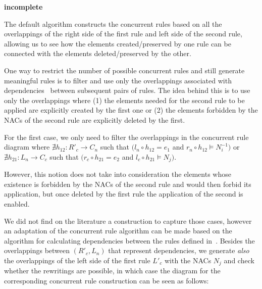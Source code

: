 \begin{definition}

  \textbf{incomplete}

  The default algorithm constructs the concurrent rules based on all the overlappings of the right side of the first rule and left side of the second rule, allowing us to see how the elements created/preserved by one rule can be connected with the elements deleted/preserved by the other.

  One way to restrict the number of possible concurrent rules and still generate meaningful rules is to filter and use only the overlappings associated with dependencies~\cite{Lambers2006} between subsequent pairs of rules. The idea behind this is to use only the overlappings where (1) the elements needed for the second rule to be applied are explicitly created by the first one or (2) the elements forbidden by the NACs of the second rule are explicitly deleted by the first.

  For the first case, we only need to filter the overlappings in the concurrent rule diagram where $\nexists h_{12} : R'_c \rightarrow C_n$ such that $(l_n \circ h_{12} = e_1$ and $r_n \circ h_{12} \models N^{-1}_i)$ or $\nexists h_{21} : L_n \rightarrow C_c$ such that $(r_c \circ h_{21} = e_2$ and $l_c \circ h_{21} \models N_j)$.

  However, this notion does not take into consideration the elements whose existence is forbidden by the NACs of the second rule and would then forbid its application, but once deleted by the first rule the application of the second is enabled.

  We did not find on the literature a construction to capture those cases, however an adaptation of the concurrent rule algorithm can be made based on the algorithm for calculating dependencies between the rules defined in~\cite{Lambers2006}. Besides the overlappings between $(R'_c, L_n)$ that represent dependencies, we generate \emph{also} the overlappings of the left side of the first rule $L'_c$ with the NACs $N_j$ and check whether the rewritings are possible, in which case the
  diagram for the corresponding concurrent rule construction can be seen as follows:


\end{definition}

